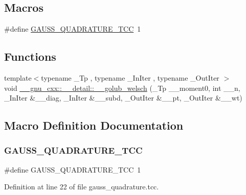\subsection*{Macros}
\begin{DoxyCompactItemize}
\item 
\#define \hyperlink{gauss__quadrature_8tcc_a15767214c365a41207a7325e17fa335b}{G\+A\+U\+S\+S\+\_\+\+Q\+U\+A\+D\+R\+A\+T\+U\+R\+E\+\_\+\+T\+CC}~1
\end{DoxyCompactItemize}
\subsection*{Functions}
\begin{DoxyCompactItemize}
\item 
{\footnotesize template$<$typename \+\_\+\+Tp , typename \+\_\+\+In\+Iter , typename \+\_\+\+Out\+Iter $>$ }\\void \hyperlink{namespace____gnu__cxx_1_1____detail_aa9f299bb7c04606a9a9aab3ab9e4f4c8}{\+\_\+\+\_\+gnu\+\_\+cxx\+::\+\_\+\+\_\+detail\+::\+\_\+\+\_\+golub\+\_\+welsch} (\+\_\+\+Tp \+\_\+\+\_\+moment0, int \+\_\+\+\_\+n, \+\_\+\+In\+Iter \&\+\_\+\+\_\+diag, \+\_\+\+In\+Iter \&\+\_\+\+\_\+subd, \+\_\+\+Out\+Iter \&\+\_\+\+\_\+pt, \+\_\+\+Out\+Iter \&\+\_\+\+\_\+wt)
\end{DoxyCompactItemize}


\subsection{Macro Definition Documentation}
\mbox{\label{gauss__quadrature_8tcc_a15767214c365a41207a7325e17fa335b}} 
\subsubsection{\texorpdfstring{G\+A\+U\+S\+S\+\_\+\+Q\+U\+A\+D\+R\+A\+T\+U\+R\+E\+\_\+\+T\+CC}{GAUSS\_QUADRATURE\_TCC}}
{\footnotesize\ttfamily \#define G\+A\+U\+S\+S\+\_\+\+Q\+U\+A\+D\+R\+A\+T\+U\+R\+E\+\_\+\+T\+CC~1}



Definition at line 22 of file gauss\+\_\+quadrature.\+tcc.

